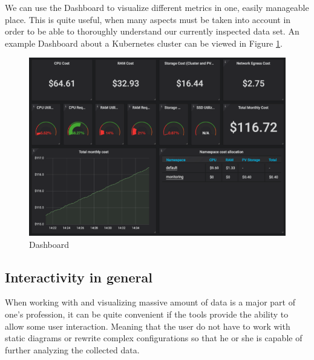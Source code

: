 We can use the Dashboard to visualize different metrics in one, easily manageable place. This is quite useful, when many aspects must be taken into account in order to be able to thoroughly understand our currently inspected data set. An example Dashboard about a Kubernetes cluster can be viewed in Figure \ref{fig:dashboard}.


\begin{figure}[H]
	\centering
	\includegraphics[width=130mm, keepaspectratio]{figures/dashboard-small.png}
	\caption{Dashboard \cite{grafana-dashboard-img}}
	\label{fig:dashboard}
\end{figure}

\subsection{Interactivity in general} \label{interactivity-general}
When working with and visualizing massive amount of data is a major part of one's profession, it can be quite convenient if the tools provide the ability to allow some user interaction. Meaning that the user do not have to work with static diagrams or rewrite complex configurations so that he or she is capable of further analyzing the collected data.

